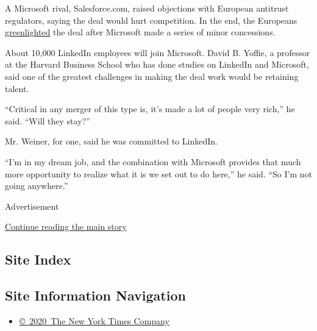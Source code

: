 A Microsoft rival, Salesforce.com, raised objections with European
antitrust regulators, saying the deal would hurt competition. In the
end, the Europeans
\href{https://blogs.microsoft.com/blog/2016/12/06/microsoft-linkedin-deal-cleared-regulators-opening-doors-people-around-world/\#sm.00000d2vaycgfmeqvrs5xuf7ztpe9}{greenlighted}
the deal after Microsoft made a series of minor concessions.

About 10,000 LinkedIn employees will join Microsoft. David B. Yoffie, a
professor at the Harvard Business School who has done studies on
LinkedIn and Microsoft, said one of the greatest challenges in making
the deal work would be retaining talent.

``Critical in any merger of this type is, it's made a lot of people very
rich,'' he said. ``Will they stay?''

Mr. Weiner, for one, said he was committed to LinkedIn.

``I'm in my dream job, and the combination with Microsoft provides that
much more opportunity to realize what it is we set out to do here,'' he
said. ``So I'm not going anywhere.''

Advertisement

\protect\hyperlink{after-bottom}{Continue reading the main story}

\hypertarget{site-index}{%
\subsection{Site Index}\label{site-index}}

\hypertarget{site-information-navigation}{%
\subsection{Site Information
Navigation}\label{site-information-navigation}}

\begin{itemize}
\tightlist
\item
  \href{https://help.nytimes3xbfgragh.onion/hc/en-us/articles/115014792127-Copyright-notice}{©~2020~The
  New York Times Company}
\end{itemize}

